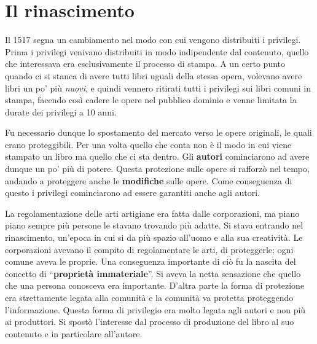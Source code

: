 

\section{Il rinascimento}

Il 1517 segna un cambiamento nel modo con cui vengono distribuiti i privilegi. Prima i privilegi venivano distribuiti in modo indipendente dal contenuto, quello che interessava era esclusivamente il processo di stampa. A un certo punto quando ci si stanca di avere tutti libri uguali della stessa opera, volevano avere libri un po' più \textit{nuovi}, e quindi vennero ritirati tutti i privilegi sui libri comuni in stampa, facendo così cadere le opere nel pubblico dominio e venne limitata la durate dei privilegi a 10 anni.

Fu necessario dunque lo spostamento del mercato verso le opere originali, le quali erano proteggibili. Per una volta quello che conta non è il modo in cui viene stampato un libro ma quello che ci sta dentro. Gli \textbf{autori} cominciarono ad avere dunque un po' più di potere. Questa protezione sulle opere si rafforzò nel tempo, andando a proteggere anche le \textbf{modifiche} sulle opere. Come conseguenza di questo i privilegi cominciarono ad essere garantiti anche agli autori.  

La regolamentazione delle arti artigiane era fatta dalle corporazioni, ma piano piano sempre più persone le stavano trovando più adatte. Si stava entrando nel rinascimento, un'epoca in cui si da più spazio all'uomo e alla sua creatività. Le corporazioni avevano il compito di regolamentare le arti, di proteggerle; ogni comune aveva le proprie. Una conseguenza importante di ciò fu la nascita del concetto di ``\textbf{proprietà immateriale}''. Si aveva la netta sensazione che quello che una persona conosceva era importante. D'altra parte la forma di protezione era strettamente legata alla comunità e la comunità va protetta proteggendo l'informazione. Questa forma di privilegio era molto legata agli autori e non più ai produttori. Si spostò l'interesse dal processo di produzione del libro al suo contenuto e in particolare all'autore.


